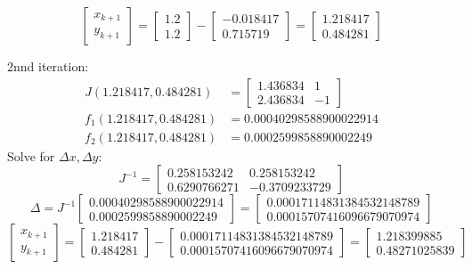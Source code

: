 \documentclass{article}
\begin{document}
\[
\begin{bmatrix} x_{k+1} \\ y_{k+1} \end{bmatrix} = \begin{bmatrix} 1.2 \\ 1.2 \end{bmatrix} - \begin{bmatrix} -0.018417 \\ 0.715719 \end{bmatrix} = \begin{bmatrix} 1.218417 \\ 0.484281 \end{bmatrix}
\]

2nnd iteration:
   \begin{align*}
      J(1.218417, 0.484281) &= \begin{bmatrix} 1.436834 & 1 \\ 2.436834 & -1 \end{bmatrix} \\
      f_1(1.218417, 0.484281) &=  0.00040298588900022914\\
      f_2(1.218417, 0.484281) &= 0.0002599858890002249
   \end{align*}
Solve for \( \Delta x, \Delta y \):
\[
J^{-1} = \begin{bmatrix} 0.258153242 & 0.258153242 \\ 0.6290766271 & -0.3709233729 \end{bmatrix}
\]
\[
\Delta = J^{-1} \begin{bmatrix} 0.00040298588900022914 \\ 0.0002599858890002249 \end{bmatrix} = \begin{bmatrix} 0.00017114831384532148789
   \\ 0.00015707416096679070974\end{bmatrix}
\]
\[
\begin{bmatrix} x_{k+1} \\ y_{k+1} \end{bmatrix} = \begin{bmatrix} 1.218417 \\ 0.484281 \end{bmatrix} - \begin{bmatrix} 0.00017114831384532148789 \\ 0.00015707416096679070974 \end{bmatrix} = \begin{bmatrix}  1.218399885 \\ 0.48271025839 \end{bmatrix}
\]
\end{document}
